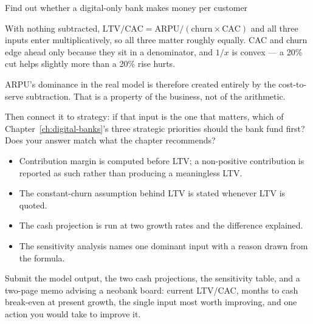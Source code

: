 \begin{labproject}{Find out whether a digital-only bank makes money per customer}
\begin{tryit}
With nothing subtracted, $\text{LTV}/\text{CAC} = \text{ARPU} / (\text{churn} \times \text{CAC})$ and all three inputs enter multiplicatively, so all three matter roughly equally. CAC and churn edge ahead only because they sit in a denominator, and $1/x$ is convex --- a 20\% cut helps slightly more than a 20\% rise hurts.

ARPU's dominance in the real model is therefore created entirely by the cost-to-serve subtraction. That is a property of the business, not of the arithmetic.

Then connect it to strategy: if that input is the one that matters, which of Chapter~\ref{ch:digital-banks}'s three strategic priorities should the bank fund first? Does your answer match what the chapter recommends?
\end{tryit}
\end{labproject}

\begin{verification}
\begin{itemize}
  \item Contribution margin is computed before LTV; a non-positive contribution is reported as such rather than producing a meaningless LTV.
  \item The constant-churn assumption behind LTV is stated whenever LTV is quoted.
  \item The cash projection is run at two growth rates and the difference explained.
  \item The sensitivity analysis names one dominant input with a reason drawn from the formula.
\end{itemize}
\end{verification}

\begin{labdeliverable}
Submit the model output, the two cash projections, the sensitivity table, and a two-page memo advising a neobank board: current LTV/CAC, months to cash break-even at present growth, the single input most worth improving, and one action you would take to improve it.
\end{labdeliverable}
